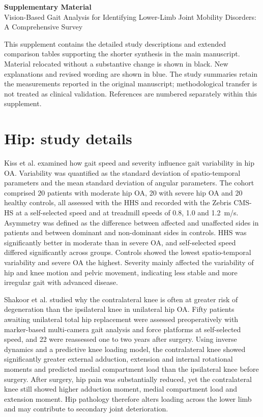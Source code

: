 \documentclass[12pt]{elsarticle}
\begin{document}
\begin{center}
{\Large\bfseries Supplementary Material}\\[8pt]
{\large Vision-Based Gait Analysis for Identifying Lower-Limb Joint Mobility Disorders: A Comprehensive Survey}
\end{center}
\begin{revision}
This supplement contains the detailed study descriptions and extended comparison tables supporting the shorter synthesis in the main manuscript. Material relocated without a substantive change is shown in black. New explanations and revised wording are shown in blue. The study summaries retain the measurements reported in the original manuscript; methodological transfer is not treated as clinical validation. References are numbered separately within this supplement.
\end{revision}
\tableofcontents
\clearpage
\section{Hip: study details}
\label{supp:S1}
{Kiss et al. \cite{kiss2010effect} examined how gait speed and severity influence gait variability in hip OA. Variability was quantified as the standard deviation of spatio-temporal parameters and the mean standard deviation of angular parameters. The cohort comprised 20 patients with moderate hip OA, 20 with severe hip OA and 20 healthy controls, all assessed with the HHS and recorded with the Zebris CMS-HS at a self-selected speed and at treadmill speeds of 0.8, 1.0 and 1.2~m/s. Asymmetry was defined as the difference between affected and unaffected sides in patients and between dominant and non-dominant sides in controls. HHS was significantly better in moderate than in severe OA, and self-selected speed differed significantly across groups. Controls showed the lowest spatio-temporal variability and severe OA the highest. Severity mainly affected the variability of hip and knee motion and pelvic movement, indicating less stable and more irregular gait with advanced disease.}

{ Shakoor et al. \cite{shakoor2003asymmetric} studied why the contralateral knee is often at greater risk of degeneration than the ipsilateral knee in unilateral hip OA. Fifty patients awaiting unilateral total hip replacement were assessed preoperatively with marker-based multi-camera gait analysis and force platforms at self-selected speed, and 22 were reassessed one to two years after surgery. Using inverse dynamics and a predictive knee loading model, the contralateral knee showed significantly greater external adduction, extension and internal rotational moments and predicted medial compartment load than the ipsilateral knee before surgery. After surgery, hip pain was substantially reduced, yet the contralateral knee still showed higher adduction moment, medial compartment load and extension moment. Hip pathology therefore alters loading across the lower limb and may contribute to secondary joint deterioration.}
\end{document}
